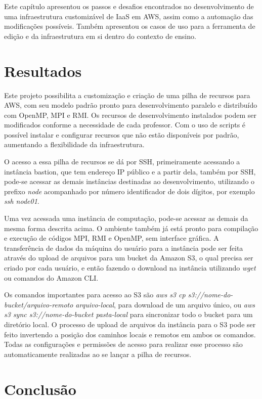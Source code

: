 \documentclass[tg]{mdtufsm}
\begin{document}
Este capítulo apresentou os passos e desafios encontrados no desenvolvimento de uma infraestrutura customizável de IaaS em AWS, assim como a automação das modificações possíveis. Também apresentou os casos de uso para a ferramenta de edição e da infraestrutura em si dentro do contexto de ensino.


\chapter{Resultados}

Este projeto possibilita a customização e criação de uma pilha de recursos para AWS, com seu modelo padrão pronto para desenvolvimento paralelo e distribuído com OpenMP, MPI e RMI. Os recursos de desenvolvimento instalados podem ser modificados conforme a necessidade de cada professor. Com o uso de scripts é possível instalar e configurar recursos que não estão disponíveis por padrão, aumentando a flexibilidade da infraestrutura.

O acesso a essa pilha de recursos se dá por SSH, primeiramente acessando a instância bastion, que tem endereço IP público e a partir dela, também por SSH, pode-se acessar as demais instâncias destinadas ao desenvolvimento, utilizando o prefixo \emph{node} acompanhado por número identificador de dois dígitos, por exemplo \emph{ssh node01}.

Uma vez acessada uma instância de computação, pode-se acessar as demais da mesma forma descrita acima. O ambiente também já está pronto para compilação e execução de códigos MPI, RMI e OpenMP, sem interface gráfica. A transferência de dados da máquina do usuário para a instância pode ser feita através do upload de arquivos para um bucket da Amazon S3, o qual precisa ser criado por cada usuário, e então fazendo o download na instância utilizando \emph{wget} ou comandos do Amazon CLI.

Os comandos importantes para acesso ao S3 são \emph{aws s3 cp s3://nome-do-bucket/arquivo-remoto arquivo-local}, para download de um arquivo único, ou \emph{aws s3 sync s3://nome-do-bucket pasta-local} para sincronizar todo o bucket para um diretório local. O processo de upload de arquivos da instância para o S3 pode ser feito invertendo a posição dos caminhos locais e remotos em ambos os comandos. Todas as configurações e permissões de acesso para realizar esse processo são automaticamente realizadas ao se lançar a pilha de recursos.

\chapter{Conclusão}
\end{document}
